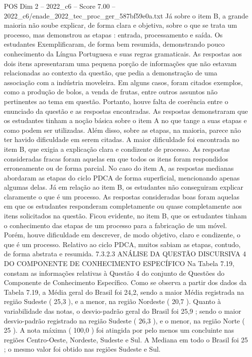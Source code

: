 \begin{textsample}{POS Dim 2 – 2022\_c6 – Score 7.00 – 2022\_c6/enade\_2022\_tec\_proc\_ger\_587bf59e0a.txt}
Já sobre o item B, a grande maioria não soube explicar, de forma clara e objetiva, sobre o que se trata um processo, mas demonstrou as etapas : entrada, processamento e saída.
Os estudantes Exemplificaram, de forma bem resumida, demonstrando pouco conhecimento da Língua Portuguesa e suas regras gramaticais.
As respostas aos dois itens apresentaram uma pequena porção de informações que não estavam relacionadas ao contexto da questão, que pedia a demonstração de uma associação com a indústria moveleira.
Em alguns casos, foram citados exemplos, como a produção de bolos, a venda de frutas, entre outros assuntos não pertinentes ao tema em questão.
Portanto, houve falta de coerência entre o enunciado da questão e as respostas encontradas.
As respostas demonstraram que os estudantes tinham a noção básica sobre o item A no que tange a suas etapas e como podem ser utilizadas.
Além disso, sobre as etapas, na maioria, parece não ter havido dificuldade em serem citadas.
A maior dificuldade foi encontrada no item B, que exigia a explicação clara e condizente de processo.
As respostas consideradas fracas foram aquelas em que todos os itens foram respondidos erroneamente ou de forma parcial.
No caso do item A, as respostas medianas abordaram as etapas do ciclo PDCA de forma superficial, mencionando apenas algumas delas.
Já em relação ao item B, os estudantes não conseguiram explicar claramente o que é um processo.
As respostas consideradas boas foram aquelas em que os estudantes responderam completamente ou quase completamente aos itens solicitados na questão.
Ficou evidente, no item B, que os estudantes tinham o conhecimento das etapas de um processo para a fabricação de um móvel.
Porém, houve dificuldade em descrever, de modo objetivo, claro e condizente, o que é um processo.
Relativo ao ciclo PDCA, muitos sabiam as etapas, contudo, de forma abstrata e resumida. 7.3.2.3 ANÁLISE DA QUESTÃO DISCURSIVA 4 DO COMPONENTE DE CONHECIMENTO ESPECÍFICO Na Tabela 7.19, constam as informações relativas à Questão 4 do conjunto de Questões do Componente de Conhecimento Específico.
Como se observa a partir dos dados da Tabela 7.19, a Média geral do Brasil foi 24,2, sendo a maior Média registrada na região Sudeste ( 25,3 ), e a menor, na região Nordeste ( 20,7 ).
Quanto à variabilidade das notas, o desvio-padrão geral do Brasil foi 25,9 ; sendo o maior desvio-padrão registrado na região Sudeste ( 26,3 ), e o menor, na região Norte ( 25 ).
A nota máxima ( 100,0 ) foi atingida por pelo menos um concluinte nas regiões Centro-Oeste, Nordeste, Sudeste e Sul.
A Mediana em todo o Brasil foi 25 ; o mesmo valor foi obtido nas regiões Sudeste e Sul.

\end{textsample}
